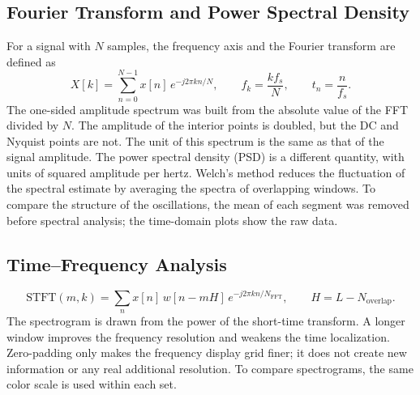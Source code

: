 \subsection{Fourier Transform and Power Spectral Density}

For a signal with $N$ samples, the frequency axis and the Fourier transform are defined as
\begin{equation}
X[k]=\sum_{n=0}^{N-1}x[n]\,e^{-j2\pi kn/N},\qquad
f_k=\frac{k f_s}{N},\qquad
t_n=\frac{n}{f_s}.
\label{eq:dft}
\end{equation}
The one-sided amplitude spectrum was built from the absolute value of the FFT divided by $N$. The amplitude of the interior points is doubled, but the DC and Nyquist points are not. The unit of this spectrum is the same as that of the signal amplitude. The power spectral density (PSD) is a different quantity, with units of squared amplitude per hertz. Welch's method reduces the fluctuation of the spectral estimate by averaging the spectra of overlapping windows. To compare the structure of the oscillations, the mean of each segment was removed before spectral analysis; the time-domain plots show the raw data.

\subsection{Time--Frequency Analysis}

\begin{equation}
\mathrm{STFT}(m,k)=\sum_{n}x[n]\,w[n-mH]\,e^{-j2\pi kn/N_{\mathrm{FFT}}},\qquad
H=L-N_{\mathrm{overlap}}.
\label{eq:stft}
\end{equation}
The spectrogram is drawn from the power of the short-time transform. A longer window improves the frequency resolution and weakens the time localization. Zero-padding only makes the frequency display grid finer; it does not create new information or any real additional resolution. To compare spectrograms, the same color scale is used within each set.

